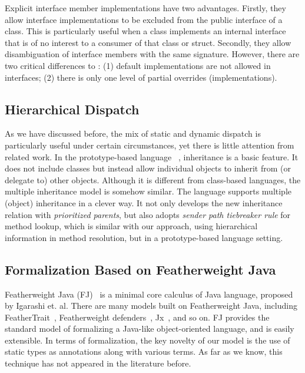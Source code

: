 Explicit interface member implementations have two advantages.
Firstly, they allow interface implementations to be excluded 
from the public interface of a class. This is particularly useful when a class implements an internal 
interface that is of no interest to a consumer of that class or struct.
Secondly, they allow disambiguation of interface members with the 
same signature. However, there are two critical differences to \MIM{}:
(1) default implementations are not allowed in \csharp{} interfaces; 
(2) there is only one level of partial overrides (implementations).

\subsection{Hierarchical Dispatch}
As we have discussed before, the mix of static and dynamic dispatch is particularly useful under certain circumstances,
yet there is little attention from related work. In the prototype-based language \self~\cite{Chambers1991}, inheritance is a basic feature.
It does not include classes but instead allow individual objects to inherit from (or delegate to) other objects. 
Although it is different from class-based languages, the multiple inheritance model is somehow similar. The \self{}
language supports multiple (object) inheritance in a clever way. It not only develops the new inheritance
relation with \emph{prioritized parents}, but also adopts \emph{sender path tiebreaker rule} for method lookup, which is similar with our approach, using hierarchical information in method resolution, but in a prototype-based language setting.

\subsection{Formalization Based on Featherweight Java}
Featherweight Java (FJ)~\cite{Igarashi01FJ} is a minimal core calculus of Java language, proposed by Igarashi et. al. There are
many models built on
Featherweight Java, including FeatherTrait~\cite{Liquori08ftj}, Featherweight defenders~\cite{goetz12fdefenders}, Jx~\cite{Nystrom2004}, and so on.
FJ provides the standard model of formalizing a Java-like object-oriented language, and 
is easily extensible. In terms of formalization, the key novelty of our model is the use of 
static types as annotations along with various terms. As far as we
know, this technique has not appeared in the literature before.








